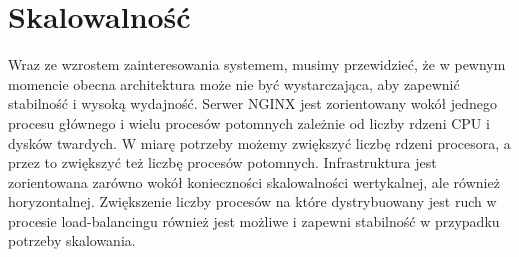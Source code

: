 \section{Skalowalność}
Wraz ze wzrostem zainteresowania systemem, musimy przewidzieć, że w pewnym momencie obecna architektura może nie być wystarczająca, aby zapewnić stabilność i wysoką wydajność. Serwer NGINX jest zorientowany wokół jednego procesu głównego i wielu procesów potomnych zależnie od liczby rdzeni CPU i dysków twardych. W miarę potrzeby możemy zwiększyć liczbę rdzeni procesora, a przez to zwiększyć też liczbę procesów potomnych.
Infrastruktura jest zorientowana zarówno wokół konieczności skalowalności wertykalnej, ale również horyzontalnej. Zwiększenie liczby procesów na które dystrybuowany jest ruch w procesie load-balancingu również jest możliwe i zapewni stabilność w przypadku potrzeby skalowania.



